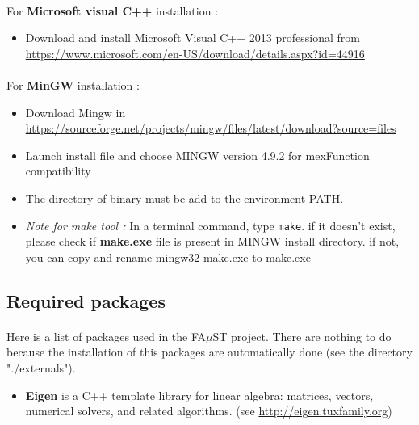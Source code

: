 \begin{enumerate}
\paragraph{}For \textbf{Microsoft visual C++} installation :
\begin{itemize}
\item Download and install Microsoft Visual C++ 2013 professional from \url{https://www.microsoft.com/en-US/download/details.aspx?id=44916}
\end{itemize}

\paragraph{}For \textbf{MinGW} installation :
\begin{itemize}
\item Download Mingw in \url{https://sourceforge.net/projects/mingw/files/latest/download?source=files}
\item Launch install file and choose MINGW version 4.9.2 for mexFunction compatibility 
\item The directory of binary must be add to the environment PATH. 

\item \textit{Note for make tool :} In a terminal command, type \texttt{make}. if it doesn't exist, please check if \textbf{make.exe} file is present in MINGW install directory. if not, you can copy and rename mingw32-make.exe to make.exe
\end{itemize}

\end{enumerate}


\subsection{Required packages}\label{sec:WinRequiredPackages}
\paragraph{}Here is a list of packages used in the FA$\mu$ST project. There are nothing to do because the installation of this packages are automatically done (see the directory "./externals").
\begin{itemize}
\item \textbf{Eigen} is a C++ template library for linear algebra: matrices, vectors, numerical solvers, and related algorithms. (see \url{http://eigen.tuxfamily.org})

\end{itemize}


